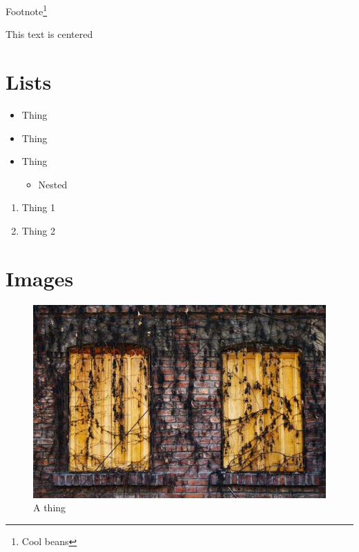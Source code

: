 \documentclass[10pt, letterpaper]{article}  %
\begin{document}
\noindent Footnote\footnote{Cool beans}

\begin{center}
    This text is centered
\end{center}



\section{Lists}

\begin{itemize}  %
    \item Thing
    \item Thing
    \item Thing
    \begin{itemize}
        \item Nested
    \end{itemize}
\end{itemize}

\noindent \hrulefill{}

\begin{enumerate}  %
    \item Thing 1
    \item Thing 2
\end{enumerate}


\section{Images}

\begin{figure}[h]  %
    \centering
    \includegraphics[width=0.75\linewidth]{images/image.jpg}
    \caption{A thing}
    \label{fig:house1}
\end{figure}
\end{document}
